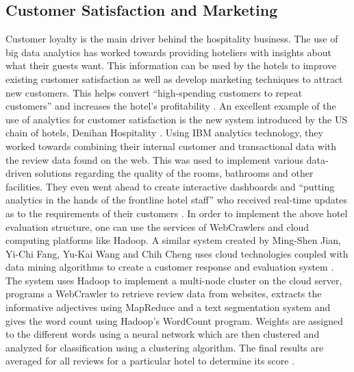 \documentclass[sigconf]{acmart}
\begin{document}
\subsection{Customer Satisfaction and Marketing}
Customer loyalty is the main driver behind the hospitality business. The use of big data analytics has worked towards providing hoteliers with insights about what their guests want. This information can be used by the hotels to improve existing customer satisfaction as well as develop marketing techniques to attract new customers. This helps convert ``high-spending customers to repeat customers'' and increases the hotel's profitability \cite {mauricio05}.
\newline An excellent example of the use of analytics for customer satisfaction is the new system introduced by the US chain of hotels, Denihan Hospitality \cite {bmarr06}. Using IBM analytics technology, they worked towards combining their internal customer and transactional data with the review data found on the web. This was used to implement various data-driven solutions regarding the quality of the rooms, bathrooms and other facilities. They even went ahead to create interactive dashboards and ``putting analytics in the hands of the frontline hotel staff'' who received real-time updates as to the requirements of their customers \cite {bmarr06}. 
\newline In order to implement the above hotel evaluation structure, one can use the services of WebCrawlers and cloud computing platforms like Hadoop. A similar system created by Ming-Shen Jian, Yi-Chi Fang, Yu-Kai Wang and Chih Cheng uses cloud technologies coupled with data mining algorithms to create a  customer response and evaluation system \cite {jianfangwang07}. The system uses Hadoop to implement a multi-node cluster on the cloud server, programs a  WebCrawler to retrieve review data from websites, extracts the informative adjectives using MapReduce and a text segmentation system and gives the word count using Hadoop's WordCount program. Weights are assigned to the different words using a neural network which are then clustered and analyzed for classification using a clustering algorithm. The final results are averaged for all reviews for a particular hotel to determine its score \cite {jianfangwang07}.
\end{document}
